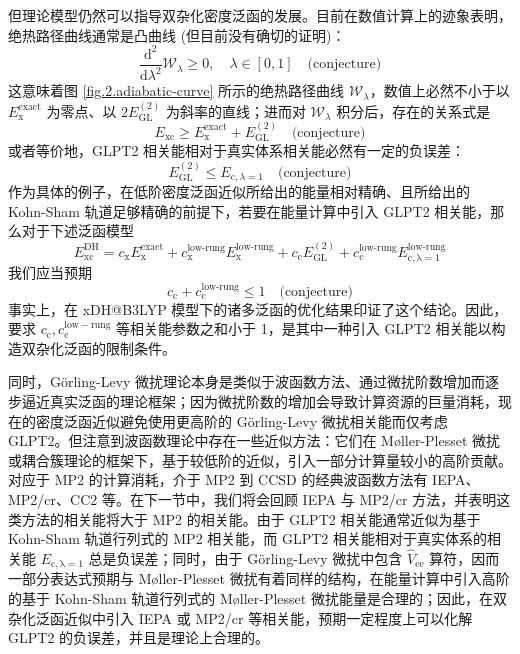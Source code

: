 但理论模型仍然可以指导双杂化密度泛函的发展。目前在数值计算上的迹象表明，绝热路径曲线通常是凸曲线\cite{Frydel-Burke.JCP.2000, Fuchs-Burke.JCP.2005, Teale-Helgaker.JCP.2009,Teale-Helgaker.JCP.2010, Carrascal-Burke.JPCM.2015} (但目前没有确切的证明\cite{Crisostomo-Burke.LMP.2023})：
\begin{equation}
  \frac{\mathrm{d}^2}{\mathrm{d} \lambda^2} \mathcal{W}_{\lambda} \geqslant 0, \quad \lambda \in [0, 1] \quad \text{(conjecture)}
\end{equation}
这意味着图 \ref{fig.2.adiabatic-curve} 所示的绝热路径曲线 $\mathcal{W}_\lambda$，数值上必然不小于以 $E_\mathrm{x}^\mathrm{exact}$ 为零点、以 $2 E_\mathrm{GL}^{(2)}$ 为斜率的直线；进而对 $\mathcal{W}_\lambda$ 积分后，存在的关系式是
\begin{equation}
  E_\mathrm{xc} \geqslant E_\mathrm{x}^\mathrm{exact} + E_\mathrm{GL}^{(2)} \quad \text{(conjecture)}
\end{equation}
或者等价地，GLPT2 相关能相对于真实体系相关能必然有一定的负误差：
\begin{equation}
  E_\mathrm{GL}^{(2)} \leqslant E_{\mathrm{c}, \lambda=1} \quad \text{(conjecture)}
\end{equation}
作为具体的例子，在低阶密度泛函近似所给出的能量相对精确、且所给出的 Kohn-Sham 轨道足够精确的前提下，若要在能量计算中引入 GLPT2 相关能，那么对于下述泛函模型
\begin{equation*}
  E_\mathrm{xc}^\mathrm{DH} = c_\mathrm{x} E_\mathrm{x}^\mathrm{exact} + c_\mathrm{x}^\text{low-rung} E_\mathrm{x}^\text{low-rung} + c_\mathrm{c} E_\mathrm{GL}^{(2)} + c_\mathrm{c}^\text{low-rung} E_\mathrm{c, \lambda=1}^\text{low-rung}
\end{equation*}
我们应当预期
\begin{equation*}
  c_\mathrm{c} + c_\mathrm{c}^\text{low-rung} \leqslant 1 \quad \text{(conjecture)}
\end{equation*}
事实上，在 xDH@B3LYP 模型下的诸多泛函的优化结果印证了这个结论\cite{Zhang-Xu.JPCL.2021}。因此，要求 $c_\mathrm{c}, c_\mathrm{c}^\mathrm{low-rung}$ 等相关能参数之和小于 1，是其中一种引入 GLPT2 相关能以构造双杂化泛函的限制条件。

同时，G\"orling-Levy 微扰理论本身是类似于波函数方法、通过微扰阶数增加而逐步逼近真实泛函的理论框架；因为微扰阶数的增加会导致计算资源的巨量消耗，现在的密度泛函近似避免使用更高阶的 G\"orling-Levy 微扰相关能而仅考虑 GLPT2。但注意到波函数理论中存在一些近似方法：它们在 M\o{}ller-Plesset 微扰或耦合簇理论的框架下，基于较低阶的近似，引入一部分计算量较小的高阶贡献。对应于 MP2 的计算消耗，介于 MP2 到 CCSD 的经典波函数方法有 IEPA\cite{Sinanoǧlu-Sinanoǧlu.ACP.1964, Nesbet-Nesbet.ACP.1965}、MP2/cr\cite{Dykstra-Davidson.IJQC.2000}、CC2\cite{Christiansen-Joergensen.CPL.1995} 等。在下一节中，我们将会回顾 IEPA 与 MP2/cr 方法，并表明这类方法的相关能将大于 MP2 的相关能。由于 GLPT2 相关能通常近似为基于 Kohn-Sham 轨道行列式的 MP2 相关能，而 GLPT2 相关能相对于真实体系的相关能 $E_\mathrm{c, \lambda=1}$ 总是负误差；同时，由于 G\"orling-Levy 微扰中包含 $\hat V_\mathrm{ee}$ 算符，因而一部分表达式预期与 M\o{}ller-Plesset 微扰有着同样的结构，在能量计算中引入高阶的基于 Kohn-Sham 轨道行列式的 M\o{}ller-Plesset 微扰能量是合理的；因此，在双杂化泛函近似中引入 IEPA 或 MP2/cr 等相关能，预期一定程度上可以化解 GLPT2 的负误差，并且是理论上合理的。

